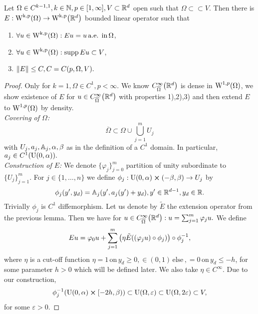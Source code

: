 \documentclass{article}
\begin{document}
\begin{theorem}
	Let $\Omega \in C^{k-1,1}, k \in {\mathbb N}, p \in [1,\infty], V \subset {\mathbb R}^d$ open such that $\Omega \subset \subset V.$ Then there is $E: \WkpSet{\Omega} \to \WkpSet{\R^d}$ bounded linear operator such that
	\begin{enumerate}
		\item $ \forall u \in \WkpSet{\Omega}: Eu=u \, \text{a.e. in} \, \Omega$,
		\item $ \forall u \in \WkpSet{\Omega}: \supp Eu \subset V$,
		\item $\norm{E} \leq C, C=C(p,\Omega,V).$
	\end{enumerate}
\end{theorem}

\begin{proof}
   Only for $k=1, \Omega \in C^1, p < \infty$. We know $C^{\infty}_{\overline{\Omega}}\qty({\mathbb R}^d)$ is dense in $\WkpSet[1][p]{\Omega}$, we show existence of $E$ for $u \in C^{\infty}_{\overline{\Omega}}\qty({\mathbb R}^d)$ with properties 1),2),3) and then extend $E$ to $\WkpSet[1][p]{\Omega}$ by density.
   \\
   \textit{Covering of $\Omega$:}
   \[
	   \overline{\Omega} \subset \Omega \cup \bigcup_{j=1}^m U_j
   \]
   with $U_j,a_j, \mathbb{A}_j, \alpha, \beta$ as in the definition of a $C^1$ domain. In particular, $a_j \in C^1\qty(\text{U}(0,\alpha)).$
   \\
   \textit{Construction of $E$:}
   We denote $\{\varphi_j \}_{j=0}^m$ partition of unity subordinate to $\{U_j\}_{j=1}^m.$ For $j \in \{1, \dots, n\}$ we define $\phi_j : \text{U}(0,\alpha) \cross (-\beta,\beta) \to U_j$ by
   \[
	   \phi_j\qty(y',y_d) = \mathbb{A}_j (y', a_j(y') + y_d), y' \in {\mathbb R}^{d-1}, y_d \in {\mathbb R}.
   \]
   Trivially $\phi_j$ is $C^1$ diffemorphism. Let us denote by $\tilde{E}$ the extension operator from the previous lemma. Then we have for $u \in C^{\infty}_{\overline{\Omega}}\qty({\mathbb R}^d): u = \sum_{j=1}^m \varphi_j u.$ We define
   \[
	   Eu=\varphi_0 u + \sum_{j=1}^m \qty(\eta \tilde{E}\qty((\varphi_j u) \circ \phi_j)) \circ \phi_j^{-1},
   \]
   where $\eta$ is a cut-off function $\eta = 1 \, \text{on} \, y_d \geq 0, \in (0,1) \, \text{else} \,, =0 \, \text{on} \, y_d \leq -h$, for some parameter $h>0$ which will be defined later. We also take $\eta \in C^\infty$. Due to our construction,
   \[
	   \phi_j^{-1} \qty(\text{U}(0,\alpha) \cross [-2h, \beta)) \subset \text{U}(\Omega,\varepsilon) \subset \text{U}(\Omega,2 \varepsilon) \subset V,  
   \]
   for some $\varepsilon>0.$

\end{proof}
\end{document}
